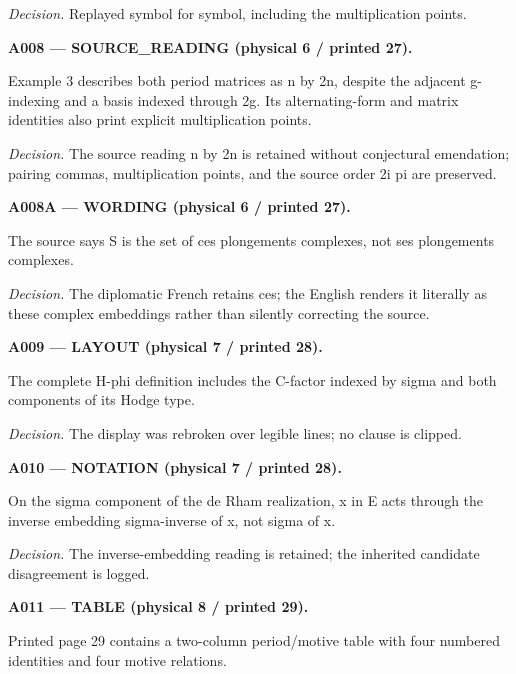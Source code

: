 \documentclass[10pt,a4paper]{article}
\begin{document}
\par\textit{Decision.} Replayed symbol for symbol, including the multiplication points.

\medskip

\noindent\textbf{A008 --- SOURCE\_READING (physical 6 / printed 27).}

Example 3 describes both period matrices as n by 2n, despite the adjacent g-indexing and a basis indexed through 2g. Its alternating-form and matrix identities also print explicit multiplication points.

\par\textit{Decision.} The source reading n by 2n is retained without conjectural emendation; pairing commas, multiplication points, and the source order 2i pi are preserved.

\medskip

\noindent\textbf{A008A --- WORDING (physical 6 / printed 27).}

The source says S is the set of ces plongements complexes, not ses plongements complexes.

\par\textit{Decision.} The diplomatic French retains ces; the English renders it literally as these complex embeddings rather than silently correcting the source.

\medskip

\noindent\textbf{A009 --- LAYOUT (physical 7 / printed 28).}

The complete H-phi definition includes the C-factor indexed by sigma and both components of its Hodge type.

\par\textit{Decision.} The display was rebroken over legible lines; no clause is clipped.

\medskip

\noindent\textbf{A010 --- NOTATION (physical 7 / printed 28).}

On the sigma component of the de Rham realization, x in E acts through the inverse embedding sigma-inverse of x, not sigma of x.

\par\textit{Decision.} The inverse-embedding reading is retained; the inherited candidate disagreement is logged.

\medskip

\noindent\textbf{A011 --- TABLE (physical 8 / printed 29).}

Printed page 29 contains a two-column period/motive table with four numbered identities and four motive relations.
\end{document}

